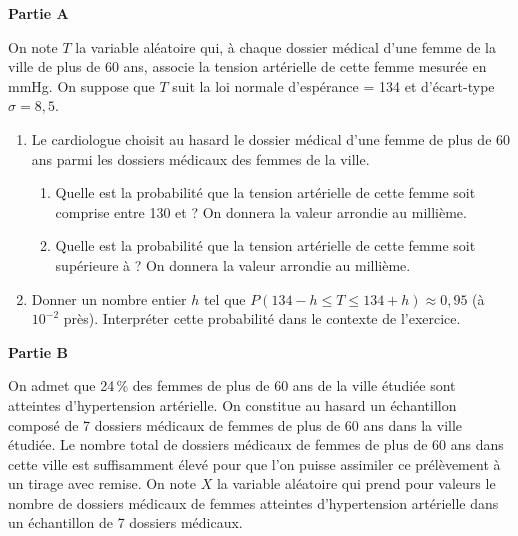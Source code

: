 \documentclass[10pt,a4paper,french]{article}
\begin{document}
\textbf{Partie A}

\medskip

On note $T$ la variable aléatoire qui, à chaque dossier médical d'une femme de la ville de plus de
60 ans, associe la tension artérielle de cette femme mesurée en mmHg. On suppose que $T$ suit la loi
normale d'espérance \textmu = 134 et d'écart-type $\sigma = 8,5$.
\begin{enumerate}
\item  Le cardiologue choisit au hasard le dossier médical d'une femme de plus de 60 ans parmi les
dossiers médicaux des femmes de la ville.
\begin{enumerate}
\item  Quelle est la probabilité que la tension artérielle de cette femme soit comprise entre
130 et  ? On donnera la valeur arrondie au millième.
\item Quelle est la probabilité que la tension artérielle de cette femme soit supérieure à
  ? On donnera la valeur arrondie au millième.
\end{enumerate}
\item Donner un nombre entier $h$ tel que $P(134 - h \leqslant T \leqslant 134 +h)\approx 0,95$ (à $10^{-2}$ près). Interpréter
cette probabilité dans le contexte de l'exercice.
\end{enumerate}

\medskip

\textbf{Partie B}

\medskip

On admet que 24\,\% des femmes de plus de 60 ans de la ville étudiée sont atteintes d'hypertension
artérielle. On constitue au hasard un échantillon composé de 7 dossiers médicaux de femmes de plus
de 60 ans dans la ville étudiée. Le nombre total de dossiers médicaux de femmes de plus de 60 ans
dans cette ville est suffisamment élevé pour que l'on puisse assimiler ce prélèvement à un tirage avec
remise. On note $X$ la variable aléatoire qui prend pour valeurs le nombre de dossiers médicaux de
femmes atteintes d'hypertension artérielle dans un échantillon de 7 dossiers médicaux.
\end{document}
